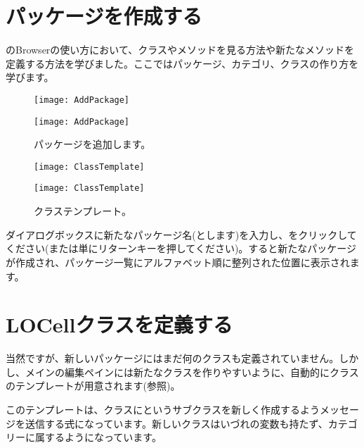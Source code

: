 \documentclass[a4paper,10pt,twoside]{book}
\begin{document}
\section{パッケージを作成する}

のBrowserの使い方において、クラスやメソッドを見る方法や新たなメソッドを定義する方法を学びました。ここではパッケージ、カテゴリ、クラスの作り方を学びます。


\begin{figure}[htb]
\begin{minipage}[b]{0.48\textwidth}
\ifluluelse
	{\centerline {\texttt{[image: AddPackage]}}}
	{\centerline {\texttt{[image: AddPackage]}}}
	\caption{パッケージを追加します。
	}
\end{minipage}
\hfill
\begin{minipage}[b]{0.48\textwidth}
\ifluluelse
	{\centerline {\texttt{[image: ClassTemplate]}}}
	{\centerline {\texttt{[image: ClassTemplate]}}}
	\caption{クラステンプレート。
	}
\end{minipage}
\end{figure}

ダイアログボックスに新たなパッケージ名(とします)を入力し、をクリックしてください(または単にリターンキーを押してください)。すると新たなパッケージが作成され、パッケージ一覧にアルファベット順に整列された位置に表示されます。

\section{LOCellクラスを定義する}

当然ですが、新しいパッケージにはまだ何のクラスも定義されていません。しかし、メインの編集ペインには新たなクラスを作りやすいように、自動的にクラスのテンプレートが用意されます(参照)。

このテンプレートは、クラスにというサブクラスを新しく作成するようメッセージを送信する\st 式になっています。新しいクラスはいづれの変数も持たず、カテゴリーに属するようになっています。
\end{document}
